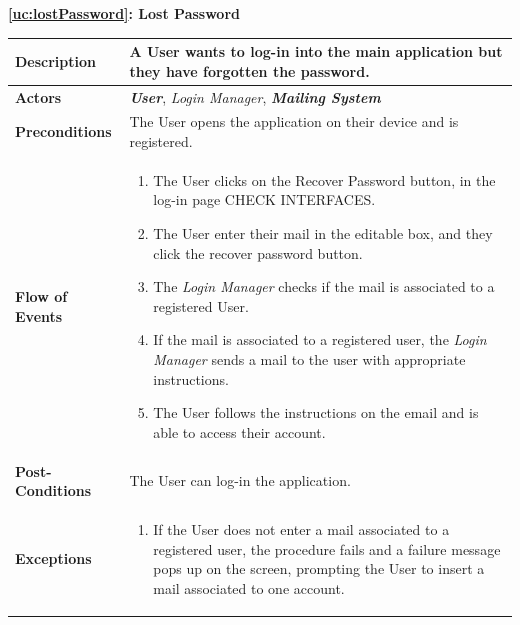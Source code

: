 \documentclass[a4paper, 10pt, oneside]{article}
\newcommand*{\lorenzo}[1]{\textcolor{BurntOrange}{#1}}
\begin{document}
\begin{center}
{\textbf{\ref{uc:lostPassword}: Lost Password}}
\end{center}
\begin{tabularx}{\linewidth}{| l | X |}
	
	\hline
	\textbf{Description} & A User wants to log-in into the main application but they have forgotten the password.\\
	

	\hline
	\textbf{Actors} & \textbf{\textit{User}}, \lorenzo{\textit{Login Manager}}, \textit{\textbf{Mailing System}} \\
	
	\hline
	\textbf{Preconditions} & The User opens the application on their device and is registered.\\
	
	\hline
	\textbf{Flow of Events} & \parbox{0.7\textwidth}{	
		\begin{enumerate}
			\item The User clicks on the Recover Password button, in the log-in page \lorenzo{CHECK INTERFACES}.
			\item The User enter their mail in the editable box, and they click the recover password button.
			\item The \lorenzo{\textit{Login Manager}} checks if the mail is associated to a registered User.
			\item If the mail is associated to a registered user, the \lorenzo{\textit{Login Manager}} sends a mail to the user with appropriate instructions.
			\item The User follows the instructions on the email and is able to access their account.
	\end{enumerate}}\\
	
	\hline
	\textbf{Post-Conditions} & The User can log-in the application.\\
	
	\hline
	\textbf{Exceptions} & \parbox{0.7\textwidth}{ \begin{enumerate}
			\item If the User does not enter a mail associated to a registered user, the procedure fails and a failure message pops up on the screen, prompting the User to insert a mail associated to one account.
		\end{enumerate}}\\

	\hline
	
\end{tabularx}
\end{document}

